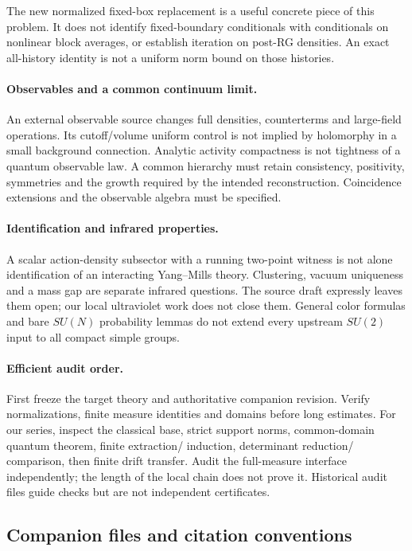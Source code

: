\documentclass[11pt]{article}
\theoremstyle{remark}
\begin{document}
The new normalized fixed-box
replacement is a useful concrete
piece of this problem. It does
not identify fixed-boundary
conditionals with conditionals
on nonlinear block averages,
or establish iteration on
post-RG densities. An exact
all-history identity is not
a uniform norm bound on
those histories.

\paragraph{Observables and a common
continuum limit.}
An external observable source
changes full densities,
counterterms and large-field
operations. Its cutoff/volume
uniform control is not implied
by holomorphy in a small
background connection.
Analytic activity compactness
is not tightness of a quantum
observable law. A common
hierarchy must retain consistency,
positivity, symmetries and the
growth required by the intended
reconstruction. Coincidence
extensions and the observable
algebra must be specified.

\paragraph{Identification and
infrared properties.}
A scalar action-density subsector
with a running two-point witness
is not alone identification of
an interacting Yang--Mills
theory. Clustering, vacuum
uniqueness and a mass gap are
separate infrared questions.
The source draft expressly
leaves them open; our local
ultraviolet work does not close
them. General color formulas
and bare \(SU(N)\) probability
lemmas do not extend every
upstream \(SU(2)\) input to
all compact simple groups.

\paragraph{Efficient audit order.}
First freeze the target theory
and authoritative companion
revision. Verify normalizations,
finite measure identities and
domains before long estimates.
For our series, inspect the
classical base, strict support
norms, common-domain quantum
theorem, finite extraction/
induction, determinant reduction/
comparison, then finite drift
transfer. Audit the full-measure
interface independently; the
length of the local chain
does not prove it. Historical
audit files guide checks but
are not independent certificates.

\subsection{Companion files and citation conventions}
\label{hrb-companions}
\end{document}
